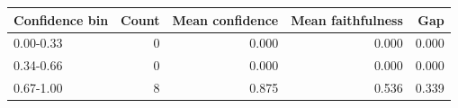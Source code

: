 \begin{tabular}{lrrrr}
\toprule
Confidence bin & Count & Mean confidence & Mean faithfulness & Gap \\
\midrule
0.00-0.33 & 0 & 0.000 & 0.000 & 0.000 \\
0.34-0.66 & 0 & 0.000 & 0.000 & 0.000 \\
0.67-1.00 & 8 & 0.875 & 0.536 & 0.339 \\
\bottomrule
\end{tabular}
